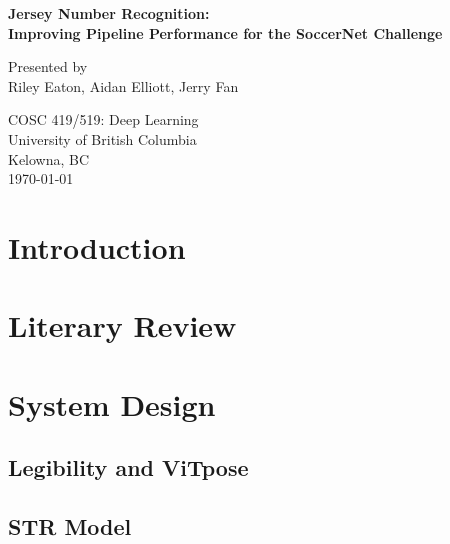 \documentclass[11pt, letterpaper]{article}
\begin{document}
\begin{titlepage}
  \begin{center}
      \vspace*{1cm}
      
      \fontsize{14}{14}\textbf{Jersey Number Recognition:} \\
      \vspace{0.1cm}
      \fontsize{14}{14}\textbf{Improving Pipeline Performance for the SoccerNet Challenge}
      
      \vspace{0.5cm}
      Presented by \\
      Riley Eaton, Aidan Elliott, Jerry Fan
      
      \vfill
          
      COSC 419/519: Deep Learning \\
      University of British Columbia \\
      Kelowna, BC \\
      \today
          
  \end{center}
\end{titlepage}

\clearpage
\section{Introduction}

\cite{aberdam_clipter_2023}

\section{Literary Review}


\section{System Design}

\subsection{Legibility and ViTpose}

\subsection{STR Model}
\end{document}
